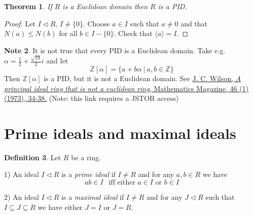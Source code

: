 \documentclass[12pt, letterpaper, oneside]{article}
\theoremstyle{plain}
\newtheorem{theorem}{Theorem}[section]
\theoremstyle{definition}
\newtheorem{definition}[theorem]{Definition}
\newtheorem{note}[theorem]{Note}
\newcommand{\Z}{{\mathbb Z}}
\newcommand{\subgp}[1]{\langle#1\rangle}
\newcommand{\vs}{\vskip 5mm}
\begin{document}
\vs\vs

\begin{theorem}
If $R$ is a Euclidean domain then $R$ is a PID. 
\end{theorem}

\vs

\begin{proof}
Let $I\lhd R$,  $I \neq \{0\}$. Choose $a\in I$ such that $a\neq 0$ and that $N(a) \leq N(b)$
for all $b\in I - \{0\}$. Check that $\subgp{a} = I$. 
\end{proof}


\vs\vs


\begin{note}
It is not true that every PID is a Euclidean domain. Take e.g. $\alpha = \frac{1}{2} + \frac{\sqrt{19}}{2}i$
and let 
$$\Z[\alpha] = \{a + b\alpha \ | \ a, b\in \Z \}$$
Then $\Z[\alpha]$ is a PID, but it is not a Euclidean domain. See 
\href{http://www.jstor.org.gate.lib.buffalo.edu/stable/pdfplus/2688577.pdf}
{J. C. Wilson, \emph{A principal ideal ring that is not a euclidean ring}, 
Mathematics Magazine, 46 (1)  (1973), 34-38.} (Note: this link requires a JSTOR access)

\end{note}




\newpage
\section{Prime ideals and maximal ideals}
\label{SEC_PRIMEMAXIDEALS}

\begin{definition}
Let $R$ be a ring. 

1) An ideal $I\lhd R$ is a \emph{prime ideal} if $I\neq R$ and for any $a, b\in R$ we have 
$$ab\in I \ \ \text{ iff  \ \ either $a\in I$ or $b\in I$} $$

2) An ideal $I\lhd R$ is a \emph{maximal ideal} if $I\neq R$ and for any $J\lhd R$
such that $I \subseteq J \subseteq R$ we have either $J=I$ or $J= R$.
\end{definition}


\vs\vs
\end{document}
